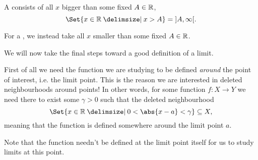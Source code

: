 \begin{example}
	A  consists of all $x$ bigger than some fixed $A \in \mathbb{R}$,
	\[
		\Set{x \in \R \given x > A} = {]{A, \infty}[}.
	\]

	\begin{figure}[H]
		\centering
	\end{figure}

	\noindent
	For a , we instead take all $x$ smaller than some fixed $A \in \mathbb{R}$.
\end{example}


We will now take the final steps toward a good definition of a limit.

 First of all we need the function we are studying to be defined \emph{around} the point of interest, i.e. the limit point.
This is the reason we are interested in deleted neighbourhoods around points!
In other words, for some function $f \colon X \to Y$ we need there to exist some $\gamma > 0$ such that the deleted neighbourhood
\[
	\Set{x \in \R \given 0 < \abs{x - a} < \gamma} \subseteq X,
\]
meaning that the function is defined somewhere around the limit point $a$.

\begin{remark}
	Note that the function needn't be defined at the limit point itself for us to study limits at this point.
\end{remark}

